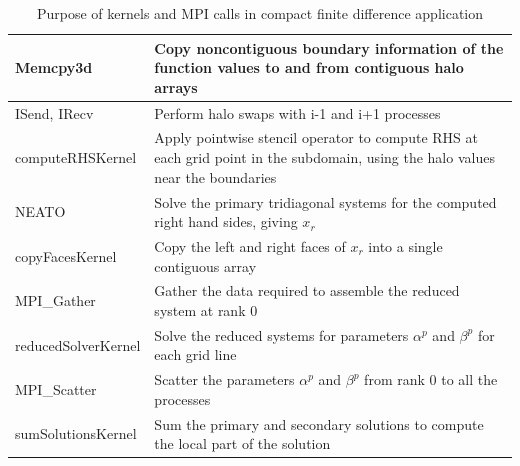 \documentclass{elsarticle}
\begin{document}
\begin{table}[]
\centering
\caption{Purpose of kernels and MPI calls in compact finite difference application}
\label{table:compact-algorithm}
\begin{tabular}{|l|p{6cm}|}
\hline
Memcpy3d            & Copy noncontiguous boundary information
                      of the function values
                      to and from contiguous halo arrays \\ \hline
ISend, IRecv        & Perform halo swaps with i-1 and i+1 processes \\ \hline
computeRHSKernel    & Apply pointwise stencil operator to compute
                      RHS at each grid point in the subdomain,
                      using the halo values near the boundaries\\ \hline
NEATO               & Solve the primary tridiagonal systems
                      for the computed right hand sides, giving $x_r$ \\ \hline
copyFacesKernel     & Copy the left and right faces of $x_r$
                      into a single contiguous array \\ \hline
MPI\_Gather         & Gather the data required to assemble
                      the reduced system at rank 0 \\ \hline
reducedSolverKernel & Solve the reduced systems for parameters
                      $\alpha^p$ and $\beta^p$
                      for each grid line \\ \hline
MPI\_Scatter        & Scatter the parameters 
                      $\alpha^p$ and $\beta^p$
                      from rank 0 to all the processes \\ \hline
sumSolutionsKernel  & Sum the primary and secondary solutions
                      to compute the local part of the solution \\ \hline
\end{tabular}
\end{table}
\end{document}
